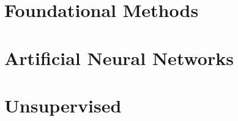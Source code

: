 \chapter{Foundational Methods}


















\chapter{Artificial Neural Networks}








\chapter{Unsupervised}






